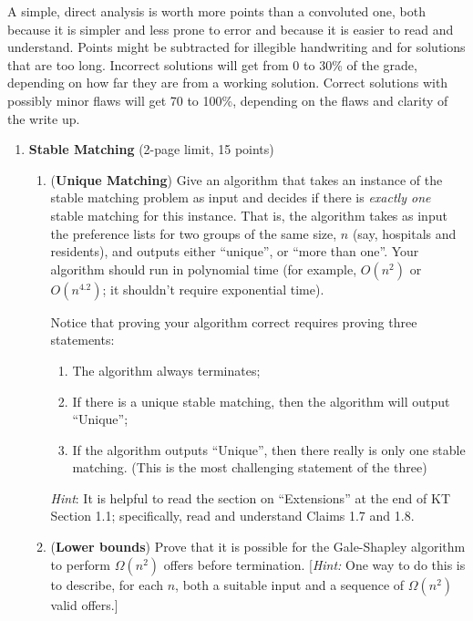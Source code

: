 \documentclass[11pt]{article}
\begin{document}
A simple, direct analysis is worth more points than a
convoluted one, both because it is simpler and less prone to error and
because it is easier to read and understand. Points might be
subtracted for illegible handwriting and for solutions that are too
long. Incorrect solutions will get from 0 to 30\% of the grade,
depending on how far they are from a working solution. Correct
solutions with possibly minor flaws will get 70 to 100\%, depending on
the flaws and clarity of the write up.


\newpage
\begin{enumerate}

  \item {\bf Stable Matching} (2-page limit, 15 points) 
\begin{enumerate}

\item ({\bf Unique Matching}) Give an algorithm that takes an instance of the stable
    matching problem as input and decides if there is {\em exactly
      one} stable matching for this instance. That is, the algorithm takes as input the preference lists for two groups of the same size, $n$ (say, hospitals and residents), and
    outputs either ``unique'', or ``more than one''. Your algorithm should run in polynomial time (for example, $O(n^2)$ or $O(n^{4.2})$; it shouldn't require exponential time).
    
    Notice that proving your algorithm correct requires proving three statements: 
    \begin{enumerate}
        \item The algorithm always terminates;
        \item If there is a unique stable matching, then the algorithm will output ``Unique'';
        \item If the algorithm outputs ``Unique'', then there really is only one stable matching. (This is the most challenging statement of the three)
    \end{enumerate}

    \emph{Hint}: It is helpful to read the section on ``Extensions'' at the
    end of KT Section 1.1; specifically, read and understand Claims 1.7 and 1.8.
    
    
    
\item ({\bf Lower bounds}) Prove that it is possible for the Gale-Shapley algorithm to perform $\Omega(n^2)$
offers before termination. [\textit{Hint:} One way to do this is to describe, for each $n$, both a suitable input and
a sequence of  $\Omega(n^2)$ valid offers.]


\end{enumerate}
\end{enumerate}
\end{document}

